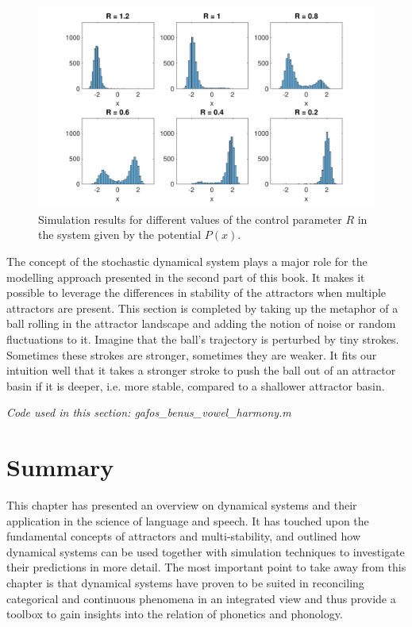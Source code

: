 \begin{figure}[hptb]
\begin{center}
\includegraphics[width=\textwidth]{figures/ch3/gafos_benus_simulation.pdf}
\caption{Simulation results for different values of the control parameter $R$ in the system given by the potential $P(x)$.}
\label{fig:gafos_benus_simulation}
\end{center}
\end{figure}

The concept of the stochastic dynamical system plays a major role for the modelling approach presented in the second part of this book. It makes it possible to leverage the differences in stability of the attractors when multiple attractors are present. This section is completed by taking up the metaphor of a ball rolling in the attractor landscape and adding the notion of noise or random fluctuations to it. Imagine that the ball's trajectory is perturbed by tiny strokes. Sometimes these strokes are stronger, sometimes they are weaker. It fits our intuition well that it takes a stronger stroke to push the ball out of an attractor basin if it is deeper, i.e. more stable, compared to a shallower attractor basin.

\medskip\noindent \textit{Code used in this section: gafos\_benus\_vowel\_harmony.m}

\section{Summary}
This chapter has presented an overview on dynamical systems and their application in the science of language and speech. It has touched upon the fundamental concepts of attractors and multi-stability, and outlined how dynamical systems can be used together with simulation techniques to investigate their predictions in more detail. The most important point to take away from this chapter is that dynamical systems have proven to be suited in reconciling categorical and continuous phenomena in an integrated view and thus provide a toolbox to gain insights into the relation of phonetics and phonology.
